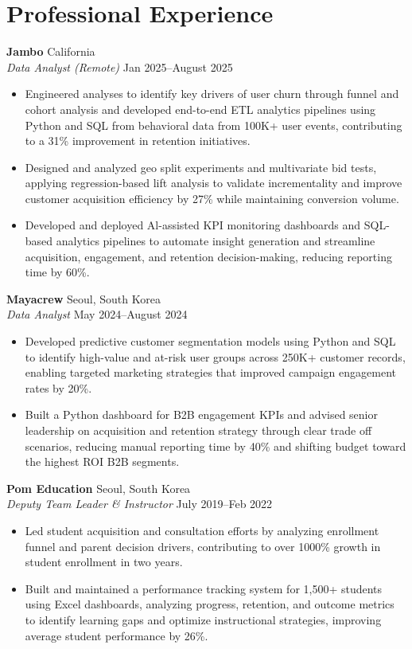 \documentclass[11pt,a4paper]{article}
\begin{document}
\section*{Professional Experience}  
\noindent
\textbf{Jambo} \hfill California   \\
\textit{Data Analyst (Remote)} \hfill Jan 2025--August 2025  
\begin{itemize}[leftmargin=*, noitemsep, topsep=0pt]
    \item Engineered analyses to identify key drivers of user churn through funnel and cohort analysis and developed end-to-end ETL analytics pipelines using Python and SQL from behavioral data from 100K+ user events, contributing to a 31\% improvement in retention initiatives.  
    \item Designed and analyzed geo split experiments and multivariate bid tests, applying regression-based lift analysis to validate incrementality and improve customer acquisition efficiency by 27\% while maintaining conversion volume.  
    \item Developed and deployed Al-assisted KPI monitoring dashboards and SQL-based analytics pipelines to automate insight generation and streamline acquisition, engagement, and retention decision-making, reducing reporting time by 60\%.  
\end{itemize}
\vspace{6pt}

\noindent
\textbf{Mayacrew} \hfill Seoul, South Korea   \\
\textit{Data Analyst} \hfill May 2024--August 2024  
\begin{itemize}[leftmargin=*, noitemsep, topsep=0pt]
    \item Developed predictive customer segmentation models using Python and SQL to identify high-value and at-risk user groups across 250K+ customer records, enabling targeted marketing strategies that improved campaign engagement rates by 20\%.  
    \item Built a Python dashboard for B2B engagement KPIs and advised senior leadership on acquisition and retention strategy through clear trade off scenarios, reducing manual reporting time by 40\% and shifting budget toward the highest ROI B2B segments.  
\end{itemize}
\vspace{6pt}

\noindent
\textbf{Pom Education} \hfill Seoul, South Korea   \\
\textit{Deputy Team Leader \& Instructor} \hfill July 2019--Feb 2022  
\begin{itemize}[leftmargin=*, noitemsep, topsep=0pt]
    \item Led student acquisition and consultation efforts by analyzing enrollment funnel and parent decision drivers, contributing to over 1000\% growth in student enrollment in two years.  
    \item Built and maintained a performance tracking system for 1,500+ students using Excel dashboards, analyzing progress, retention, and outcome metrics to identify learning gaps and optimize instructional strategies, improving average student performance by 26\%.  
\end{itemize}
\end{document}
